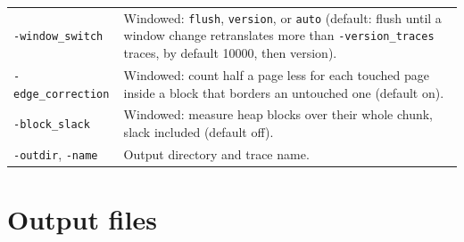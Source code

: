 \documentclass[11pt]{article}
\newcommand{\knob}[1]{\texttt{-#1}}
\begin{document}
\begin{table}[h]
\begin{tabular}{lp{11cm}}
\knob{window\_switch} & Windowed: \texttt{flush}, \texttt{version}, or \texttt{auto} (default: flush until a window change retranslates more than \knob{version\_traces} traces, by default 10000, then version). \\
\knob{edge\_correction} & Windowed: count half a page less for each touched page inside a block that borders an untouched one (default on). \\
\knob{block\_slack} & Windowed: measure heap blocks over their whole chunk, slack included (default off). \\
\knob{outdir}, \knob{name} & Output directory and trace name. \\
\bottomrule
\end{tabular}
\end{table}

\section{Output files}
\label{app:outputs}
\sloppy
\end{document}
